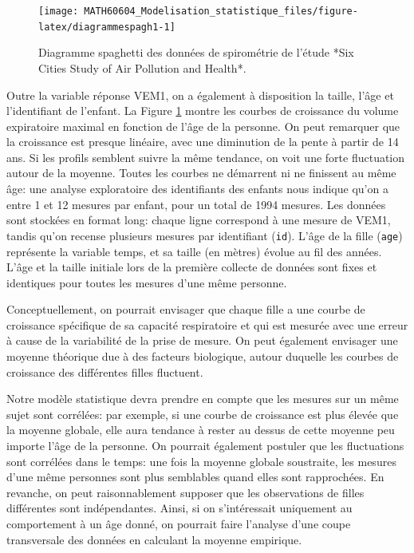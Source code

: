 \documentclass[
  11pt,
  letterpaper,
]{article}
\theoremstyle{definition}
\theoremstyle{definition}
\theoremstyle{definition}
\theoremstyle{definition}
\theoremstyle{remark}
\begin{document}
\begin{figure}

{\centering \texttt{[image: MATH60604\_Modelisation\_statistique\_files/figure-latex/diagrammespagh1-1]} 

}

\caption{Diagramme spaghetti des données de spirométrie de l'étude *Six Cities Study of Air Pollution and Health*.}\label{fig:diagrammespagh1}
\end{figure}

Outre la variable réponse VEM1, on a également à disposition la taille, l'âge et l'identifiant de l'enfant. La Figure \ref{fig:diagrammespagh1} montre les courbes de croissance du volume expiratoire maximal en fonction de l'âge de la personne. On peut remarquer que la croissance est presque linéaire, avec une diminution de la pente à partir de 14 ans. Si les profils semblent suivre la même tendance, on voit une forte fluctuation autour de la moyenne. Toutes les courbes ne démarrent ni ne finissent au même âge: une analyse exploratoire des identifiants des enfants nous indique qu'on a entre 1 et 12 mesures par enfant, pour un total de 1994 mesures. Les données sont stockées en format long: chaque ligne correspond à une mesure de VEM1, tandis qu'on recense plusieurs mesures par identifiant (\texttt{id}). L'âge de la fille (\texttt{age}) représente la variable temps, et sa taille (en mètres) évolue au fil des années. L'âge et la taille initiale lors de la première collecte de données sont fixes et identiques pour toutes les mesures d'une même personne.

Conceptuellement, on pourrait envisager que chaque fille a une courbe de croissance spécifique de sa capacité respiratoire et qui est mesurée avec une erreur à cause de la variabilité de la prise de mesure. On peut également envisager une moyenne théorique due à des facteurs biologique, autour duquelle les courbes de croissance des différentes filles fluctuent.

Notre modèle statistique devra prendre en compte que les mesures sur un même sujet sont corrélées: par exemple, si une courbe de croissance est plus élevée que la moyenne globale, elle aura tendance à rester au dessus de cette moyenne peu importe l'âge de la personne. On pourrait également postuler que les fluctuations sont corrélées dans le temps: une fois la moyenne globale soustraite, les mesures d'une même personnes sont plus semblables quand elles sont rapprochées. En revanche, on peut raisonnablement supposer que les observations de filles différentes sont indépendantes. Ainsi, si on s'intéressait uniquement au comportement à un âge donné, on pourrait faire l'analyse d'une coupe transversale des données en calculant la moyenne empirique.
\end{document}

